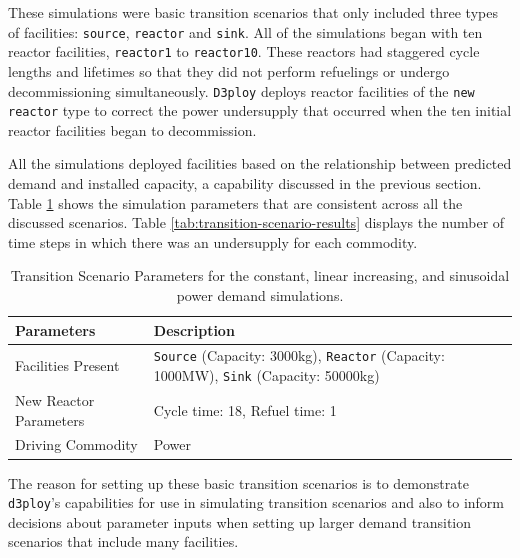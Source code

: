 \documentclass[11pt,letterpaper]{article}
\newcommand{\deploy}{\texttt{d3ploy}\xspace}%
\newcommand{\Deploy}{\texttt{D3ploy}\xspace}%
\begin{document}
These simulations were basic transition scenarios that only included 
three types of facilities: \texttt{source}, \texttt{reactor} and 
\texttt{sink}.
All of the simulations began with ten reactor facilities, 
\texttt{reactor1} to \texttt{reactor10}.
These reactors had staggered cycle lengths and lifetimes 
so that they did not perform refuelings or undergo decommissioning simultaneously.
\Deploy deploys reactor facilities of the \texttt{new reactor} type
to correct the power undersupply that occurred when the ten initial 
reactor facilities began to decommission.

All the simulations deployed facilities based on the relationship
between predicted demand and installed capacity, a capability 
discussed in the previous section.
Table \ref{tab:transition-scenario-all} shows the simulation 
parameters that are consistent across all the discussed 
scenarios. Table \ref{tab:transition-scenario-results} displays
the number of time steps in which there was an undersupply for
each commodity.

\begin{table}[htb]
    \centering
    \caption {Transition Scenario Parameters for the constant, linear increasing, and sinusoidal power demand simulations.}
	\label{tab:transition-scenario-all}
    \begin{tabular}{|l|p{4.5cm}|}
    \hline
    \textbf{Parameters}    & \textbf{Description} \\ \hline
    Facilities Present     & \texttt{Source} (Capacity: 3000kg), \texttt{Reactor} (Capacity: 1000MW), \texttt{Sink} (Capacity: 50000kg)      \\ \hline
    New Reactor Parameters & Cycle time: 18, Refuel time: 1\\ \hline
    Driving Commodity & Power \\ \hline
    \end{tabular}
\end{table}

The reason for setting up these basic transition scenarios is to 
demonstrate \deploy's capabilities for use in simulating 
transition scenarios and 
also to inform decisions about parameter inputs when setting up larger 
demand transition scenarios that include many facilities. 
\end{document}
